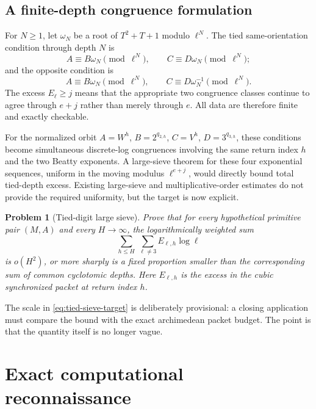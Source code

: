 \documentclass[11pt]{article}
\newtheorem{problem}[theorem]{Problem}
\theoremstyle{definition}
\theoremstyle{remark}
\begin{document}
\subsection{A finite-depth congruence formulation}

For $N\ge1$, let $\omega_N$ be a root of $T^2+T+1$ modulo $\ell^N$.  The tied same-orientation condition through depth $N$ is
\begin{equation}\label{eq:finite-same}
 A\equiv B\omega_N\pmod{\ell^N},
 \qquad
 C\equiv D\omega_N\pmod{\ell^N};
\end{equation}
and the opposite condition is
\begin{equation}\label{eq:finite-opposite}
 A\equiv B\omega_N\pmod{\ell^N},
 \qquad
 C\equiv D\omega_N^{-1}\pmod{\ell^N}.
\end{equation}
The excess $E_\ell\ge j$ means that the appropriate two congruence classes continue to agree through $e+j$ rather than merely through $e$.  All data are therefore finite and exactly checkable.

For the normalized orbit $A=W^h$, $B=2^{q_{2,h}}$, $C=V^h$, $D=3^{q_{3,h}}$, these conditions become simultaneous discrete-log congruences involving the same return index $h$ and the two Beatty exponents.  A large-sieve theorem for these four exponential sequences, uniform in the moving modulus $\ell^{e+j}$, would directly bound total tied-depth excess.  Existing large-sieve and multiplicative-order estimates do not provide the required uniformity, but the target is now explicit.

\begin{problem}[Tied-digit large sieve]\label{prob:tied-digit-sieve}
Prove that for every hypothetical primitive pair $(M,A)$ and every $H\to\infty$, the logarithmically weighted sum
\begin{equation}\label{eq:tied-sieve-target}
 \sum_{h\le H}\ \sum_{\ell\ne3} E_{\ell,h}\log\ell
\end{equation}
is $o(H^2)$, or more sharply is a fixed proportion smaller than the corresponding sum of common cyclotomic depths.  Here $E_{\ell,h}$ is the excess in the cubic synchronized packet at return index $h$.
\end{problem}

The scale in \eqref{eq:tied-sieve-target} is deliberately provisional: a closing application must compare the bound with the exact archimedean packet budget.  The point is that the quantity itself is no longer vague.

\section{Exact computational reconnaissance}
\label{sec:computation}
\end{document}
